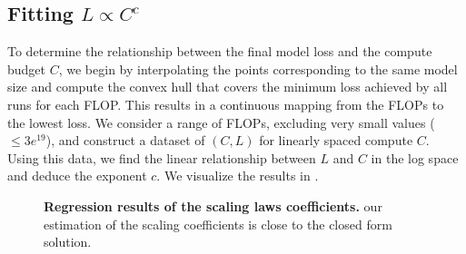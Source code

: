 \subsection{Fitting \(L \propto C^c\)}  
To determine the relationship between the final model loss and the compute budget \(C\), we begin by interpolating the points corresponding to the same model size and compute the convex hull that covers the minimum loss achieved by all runs for each FLOP. This results in a continuous mapping from the FLOPs to the lowest loss. We consider a range of FLOPs, excluding very small values ($\leq 3e^{19}$), and construct a dataset of \((C, L)\) for linearly spaced compute \(C\). Using this data, we find the linear relationship between \(L\) and \(C\) in the log space and deduce the exponent \(c\). We visualize the results in .









\begin{figure}[h!]
    \centering
    \captionsetup{type=figure}
    \begin{subfigure}[t]{1\linewidth}



    \begin{subfigure}[t]{0.47\linewidth}
        
    \end{subfigure}
    \begin{subfigure}[t]{0.47\linewidth}
        
    \end{subfigure}
    
    \begin{subfigure}[t]{0.47\linewidth}
        
    \end{subfigure}
    \begin{subfigure}[t]{0.47\linewidth}
        
    \end{subfigure}
    
    \begin{subfigure}[t]{0.47\linewidth}
        
    \end{subfigure}
    \begin{subfigure}[t]{0.47\linewidth}
        
    \end{subfigure}

    


      
    \end{subfigure}
    \caption{\textbf{Regression results of the scaling laws coefficients.} our estimation of the scaling coefficients is close to the closed form solution.}
    \label{fig:scaling_laws_closed_form_early_late}
\end{figure}


